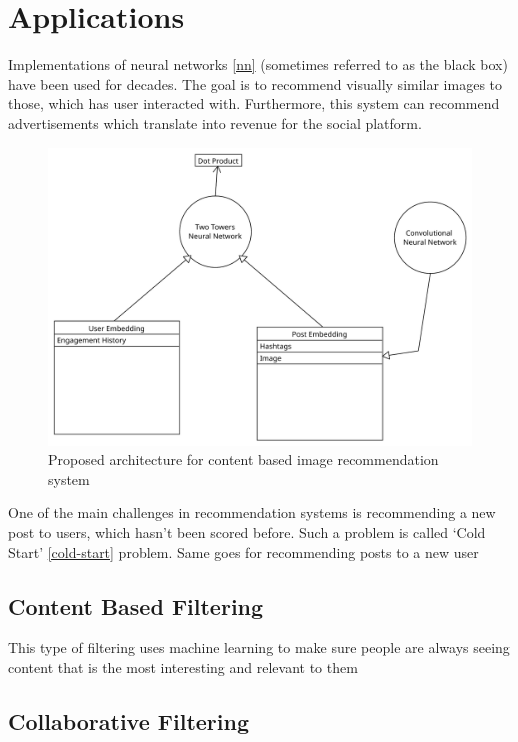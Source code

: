 \section{Applications} \label{applications}

Implementations of neural networks \ref{nn} (sometimes referred to as the black box) have been used for decades. The goal is to recommend visually similar images to those, which has user interacted with. Furthermore, this system can recommend advertisements which translate into revenue for the social platform. 

\begin{figure}[h]
    \centering
    \includegraphics[width=0.7\linewidth]{Diagrams/architecture.pdf}
    \caption{Proposed architecture for content based image recommendation system}
    \label{fig:proposed-alogrithm}
\end{figure}

One of the main challenges in recommendation systems is recommending a new post to users, which hasn't been scored before. Such a problem is called ‘Cold Start' \ref{cold-start} problem. \cite{10373857} Same goes for recommending posts to a new user

\subsection{Content Based Filtering}\label{applications/content-based-filtering}

This type of filtering uses machine learning to make sure people are always seeing content that is the most interesting and relevant to them \cite{ig-new-content}


\subsection{Collaborative Filtering}\label{applications/collaborative-filtering}

